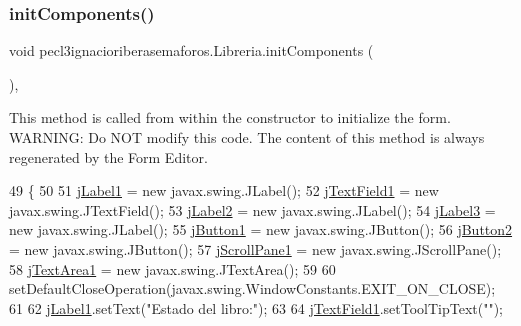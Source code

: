 \subsubsection{\texorpdfstring{init\+Components()}{initComponents()}}
{\footnotesize\ttfamily void pecl3ignacioriberasemaforos.\+Libreria.\+init\+Components (\begin{DoxyParamCaption}{ }\end{DoxyParamCaption})\hspace{0.3cm}{\ttfamily [inline]}, {\ttfamily [private]}}

This method is called from within the constructor to initialize the form. W\+A\+R\+N\+I\+NG\+: Do N\+OT modify this code. The content of this method is always regenerated by the Form Editor. 
\begin{DoxyCode}
49                                   \{
50 
51         \mbox{\hyperlink{classpecl3ignacioriberasemaforos_1_1_libreria_a36680cb4c901e0d6bba25a3b8803a92a}{jLabel1}} = \textcolor{keyword}{new} javax.swing.JLabel();
52         \mbox{\hyperlink{classpecl3ignacioriberasemaforos_1_1_libreria_a74a337cc4164c782f28eaafde5fa64c1}{jTextField1}} = \textcolor{keyword}{new} javax.swing.JTextField();
53         \mbox{\hyperlink{classpecl3ignacioriberasemaforos_1_1_libreria_a9362ca0b92689073199ca1afac99fa07}{jLabel2}} = \textcolor{keyword}{new} javax.swing.JLabel();
54         \mbox{\hyperlink{classpecl3ignacioriberasemaforos_1_1_libreria_a8e5cccc84e9e79697bd6a0e06d1f5bcc}{jLabel3}} = \textcolor{keyword}{new} javax.swing.JLabel();
55         \mbox{\hyperlink{classpecl3ignacioriberasemaforos_1_1_libreria_ae9afe865b26a1ef3fc5a8a9dbedfc319}{jButton1}} = \textcolor{keyword}{new} javax.swing.JButton();
56         \mbox{\hyperlink{classpecl3ignacioriberasemaforos_1_1_libreria_ac544c8592612a783615a2d8e7f58e4db}{jButton2}} = \textcolor{keyword}{new} javax.swing.JButton();
57         \mbox{\hyperlink{classpecl3ignacioriberasemaforos_1_1_libreria_a0b0a7cf10b835445e40913dff41cd78d}{jScrollPane1}} = \textcolor{keyword}{new} javax.swing.JScrollPane();
58         \mbox{\hyperlink{classpecl3ignacioriberasemaforos_1_1_libreria_a6edf2e9a5b9f87fa2d5e0f94ef29a887}{jTextArea1}} = \textcolor{keyword}{new} javax.swing.JTextArea();
59 
60         setDefaultCloseOperation(javax.swing.WindowConstants.EXIT\_ON\_CLOSE);
61 
62         \mbox{\hyperlink{classpecl3ignacioriberasemaforos_1_1_libreria_a36680cb4c901e0d6bba25a3b8803a92a}{jLabel1}}.setText(\textcolor{stringliteral}{"Estado del libro:"});
63 
64         \mbox{\hyperlink{classpecl3ignacioriberasemaforos_1_1_libreria_a74a337cc4164c782f28eaafde5fa64c1}{jTextField1}}.setToolTipText(\textcolor{stringliteral}{""});

\end{DoxyCode}
